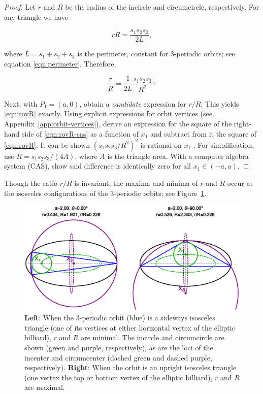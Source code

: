 \begin{proof}
Let $r$ and $R$ be the radius of the incircle and circumcircle, respectively. For any triangle \cite{coxeter67} we have

\begin{equation*}
 rR=\frac{s_1s_2s_3}{2 L}, 
\end{equation*}

\noindent where $L=s_1+s_2+s_3$ is the perimeter, constant for 3-periodic orbits; see equation \eqref{eqn:perimeter}. Therefore,

\begin{equation}
\frac{r}{R}=\frac{1}{2L} \frac{s_1s_2s_3}{R^2}\cdot
\label{eqn:rovR-cas}
\end{equation}

Next, with $P_1=(a,0)$, obtain a {\em candidate} expression for $r/R$. This yields \eqref{eqn:rovR} exactly. Using explicit expressions for orbit vertices (see Appendix~\ref{app:orbit-vertices}), derive an expression for the square of the right-hand side of \eqref{eqn:rovR-cas} as a function of $x_1$ and subtract from it the square of \eqref{eqn:rovR}. It can be shown $\left(s_1s_2s_3/R^2\right)^2$ is rational on $x_1$ \cite{reznik2020-loci}. For simplification, use $R=s_1 s_2 s_3/(4A)$, where $A$ is the triangle area. With a computer algebra system (CAS), show said difference is identically zero for all $x_1\in(-a,a)$.
\end{proof}

Though the ratio $r/R$ is invariant, the maxima and minima of $r$ and $R$ occur at the isosceles configurations of the 3-periodic orbits; see Figure~\ref{fig:rR-min-max}. 

\begin{figure}[H]
    \centering
    \includegraphics[trim={0 0.5cm 0 0},clip,width=\textwidth]{1060_radii_min_max_orbits}
    \caption{\textbf{Left}: When the 3-periodic orbit (blue) is a sideways isosceles triangle (one of its vertices   at either horizontal vertex of the elliptic billiard), $r$ and $R$ are minimal. The incircle and circumcircle are shown (green and purple, respectively), as are the loci of the incenter and circumcenter (dashed green and dashed purple, respectively). \textbf{Right}: When the orbit is an upright isosceles triangle (one vertex   the top or bottom vertex of the elliptic billiard), $r$ and $R$ are maximal.}
    \label{fig:rR-min-max}
\end{figure}

